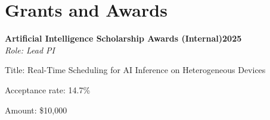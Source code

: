\documentclass[letterpaper,10pt]{article}
\newcommand{\heading}[2]{
  \hspace{10pt}#1\hfill#2\\
}
\newcommand{\headingBf}[2]{
  \heading{\textbf{#1}}{\textbf{#2}}
}
\newcommand{\headingIt}[2]{
  \heading{\textit{#1}}{\textit{#2}}
}
\newenvironment{resume_list}{
  \vspace{-7pt}
  \begin{itemize}[itemsep=-2px, parsep=1pt, leftmargin=30pt]
}{
  \end{itemize}
}
\newcommand{\itemTitle}[1]{
  \item[] \underline{#1}\vspace{4pt}
}
\begin{document}
\section{Grants and Awards}
\headingBf{Artificial Intelligence Scholarship Awards (Internal)}{2025}
\headingIt{Role: Lead PI}{}
\begin{resume_list}
    \item Title: Real-Time Scheduling for AI Inference on Heterogeneous Devices
    \item Acceptance rate: 14.7\%
    \item Amount: \$10,000
\end{resume_list}

    



\end{document}
